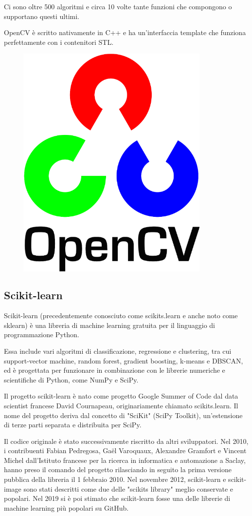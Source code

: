 Ci sono oltre 500 algoritmi e circa 10 volte tante funzioni che compongono o supportano questi ultimi.

OpenCV è scritto nativamente in C++ e ha un'interfaccia template che funziona perfettamente con i contenitori STL.

\begin{figure}
    \begin{center}    
        \includegraphics[width=0.5\linewidth]{images/image8.png}
    \end{center}
\end{figure}

\subsection{Scikit-learn \cite{scikitLearn}}
Scikit-learn (precedentemente conosciuto come scikits.learn e anche noto come sklearn) è una libreria di machine learning gratuita per il linguaggio di programmazione Python. 

Essa include vari algoritmi di classificazione, regressione e clustering, tra cui support-vector machine, random forest, gradient boosting, k-means e DBSCAN, ed è progettata per funzionare in combinazione con le librerie numeriche e scientifiche di Python, come NumPy e SciPy. 

Il progetto scikit-learn è nato come progetto Google Summer of Code dal data scientist francese David Cournapeau, originariamente chiamato scikits.learn. Il nome del progetto deriva dal concetto di "SciKit" (SciPy Toolkit), un'estensione di terze parti separata e distribuita per SciPy. 

Il codice originale è stato successivamente riscritto da altri sviluppatori. Nel 2010, i contribuenti Fabian Pedregosa, Gaël Varoquaux, Alexandre Gramfort e Vincent Michel dall'Istituto francese per la ricerca in informatica e automazione a Saclay, hanno preso il comando del progetto rilasciando in  seguito la prima versione pubblica della libreria il 1 febbraio 2010. Nel novembre 2012, scikit-learn e scikit-image sono stati descritti come due delle "scikits library" meglio conservate e popolari. 
Nel 2019 si è poi stimato che scikit-learn fosse una delle librerie di machine learning più popolari su GitHub.

